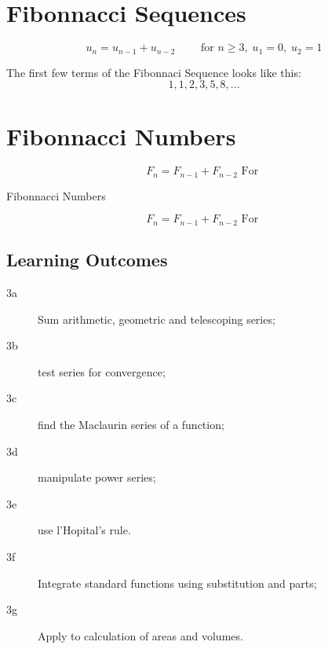 \documentclass[]{report}
\begin{document}
\section{Fibonnacci Sequences}



\[ u_n = u_{n-1} + u_{n-2} \qquad \mbox{ for } n \geq 3 ,\; u_1=0,\;u_2=1 \]


The first few terms of the Fibonnaci Sequence looks like this:
\[ 1, 1, 2, 3, 5, 8, \ldots\]

\bigskip

\section{Fibonnacci Numbers}

\[ F_{n} = F_{n-1} + F_{n-2} \mbox{ For }\]






{Fibonnacci Numbers}

\[ F_{n} = F_{n-1} + F_{n-2} \mbox{ For }\]



\newpage

	
	\subsection{Learning Outcomes}
		\begin{description}
			\item[3a] Sum arithmetic, geometric and telescoping series; 
			\item[3b] test series for convergence; 
			\item[3c] find the Maclaurin series of a function; 
			\item[3d] manipulate power series; 
			\item[3e] use l'Hopital's rule. 
			\item[3f] Integrate standard functions using substitution and parts; 
			\item[3g] Apply to calculation of areas and volumes. 
		\end{description}
	
	
\end{document}
